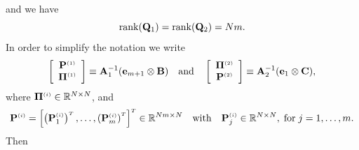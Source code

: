 %
and we have
%
\begin{equation*}%
\mathrm{rank}(\Q_1) = \mathrm{rank}(\Q_2)=Nm.
\end{equation*}
%
In order to simplify the notation we write
%
\begin{equation}\label{eq:2D:pi_and_p}
\left[
  \begin{array}{c}
    \POne \\ \PiOne
  \end{array}
\right]
\equiv
\A_1^{-1}(\e_{m+1}\otimes \B)%
\quad\mathrm{and}\quad
\left[
  \begin{array}{c}
    \PiTwo \\ \PTwo
  \end{array}
\right]
\equiv
\A_2^{-1}(\e_{1}\otimes \C),
\end{equation}
%
where $\mathbf{\Pi}^{\scriptscriptstyle (i)} \in \mathbb{R}^{N\times N}$, and
%
\begin{equation*}
\mathbf{P}^{\scriptscriptstyle (i)} =
\left[\left(\mathbf{P}_1^{\scriptscriptstyle (i)}\right)^{\scriptscriptstyle T},\ldots,
\left(\mathbf{P}_{m}^{\scriptscriptstyle (i)}\right)^{\scriptscriptstyle T}\right]^{\scriptscriptstyle T}
\in \mathbb{R}^{Nm\times N}\quad\mathrm{with}\quad \mathbf{P}^{\scriptscriptstyle (i)}_j
\in \mathbb{R}^{N\times N},\;\mathrm{for}\;j=1,\dots,m.
\end{equation*}
%
Then
%
